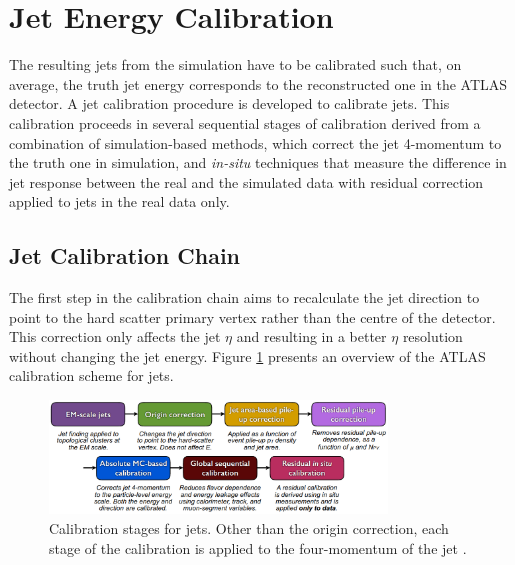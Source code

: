 \section{Jet Energy Calibration}
\label{Jet:Cal}
The resulting jets from the simulation have to be calibrated such that, on average, the truth jet energy corresponds to the reconstructed one in the ATLAS detector. A jet calibration procedure is developed to calibrate jets. This calibration proceeds in several sequential stages of calibration derived from a combination of simulation-based methods, which correct the jet 4-momentum to the truth one in simulation, and \textit{in-situ} techniques that measure the difference in jet response between the real and the simulated data with residual correction applied to jets in the real data only.

\subsection{Jet Calibration Chain}
\label{Jet:Cal:chain}
 The first step in the calibration chain aims to recalculate the jet direction to point to the hard scatter primary vertex rather than the centre of the detector. This correction only affects the jet $\eta$ and resulting in a better $\eta$ resolution without changing the jet energy. Figure \ref{fig:Jet:Cal:chain} presents an overview of the ATLAS calibration scheme for jets.
\begin{figure}[htbp]
     \centering
     \includegraphics[width=0.8\textwidth]{Ch4/Img/calibration_chain.png}
     \caption{Calibration stages for jets. Other than the origin correction, each stage of the calibration is applied to the four-momentum of the jet \cite{JES_Sys_13_TeV}.}
     \label{fig:Jet:Cal:chain}
 \end{figure}

